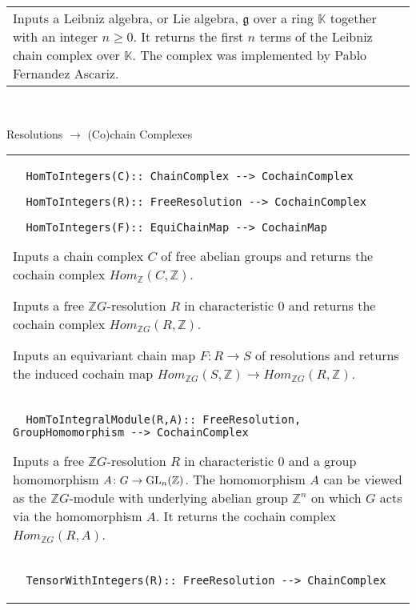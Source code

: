 \documentclass[a4paper,11pt]{report}
\begin{document}
{\begin{center}
\begin{tabular}{|l|}
 Inputs a Leibniz algebra, or Lie algebra, $\mathfrak{g}$ over a ring $\mathbb K$ together with an integer $n\ge 0$. It returns the first $n$ terms of the Leibniz chain complex over $\mathbb K$. The complex was implemented by Pablo Fernandez Ascariz. \\
\end{tabular}\\[2mm]
\end{center}

 Resolutions $\longrightarrow $ (Co)chain Complexes \begin{center}
\begin{tabular}{|l|} \index{HomToIntegers} 
\begin{verbatim}  HomToIntegers(C):: ChainComplex --> CochainComplex
\end{verbatim}
 
\begin{verbatim}  HomToIntegers(R):: FreeResolution --> CochainComplex
\end{verbatim}
 
\begin{verbatim}  HomToIntegers(F):: EquiChainMap --> CochainMap
\end{verbatim}


 

 Inputs a chain complex $C$ of free abelian groups and returns the cochain complex $Hom_{\mathbb Z}(C,\mathbb Z)$. 

 Inputs a free $\mathbb ZG$-resolution $R$ in characteristic $0$ and returns the cochain complex $Hom_{\mathbb ZG}(R,\mathbb Z)$. 

 Inputs an equivariant chain map $F\colon R\rightarrow S$ of resolutions and returns the induced cochain map $Hom_{\mathbb ZG}(S,\mathbb Z) \longrightarrow Hom_{\mathbb ZG}(R,\mathbb Z)$. \\
 \index{HomToIntegralModule} 
\begin{verbatim}  HomToIntegralModule(R,A):: FreeResolution, GroupHomomorphism --> CochainComplex
\end{verbatim}


 

 Inputs a free $\mathbb ZG$-resolution $R$ in characteristic $0$ and a group homomorphism $A\colon G \rightarrow {\rm GL}_n(\mathbb Z)$. The homomorphism $A$ can be viewed as the $\mathbb ZG$-module with underlying abelian group $\mathbb Z^n$ on which $G$ acts via the homomorphism $A$. It returns the cochain complex $Hom_{\mathbb ZG}(R,A)$. \\
 \index{TensorWithIntegers} 
\begin{verbatim}  TensorWithIntegers(R):: FreeResolution --> ChainComplex
\end{verbatim}
 

\end{tabular}
\end{center}}
\end{document}
